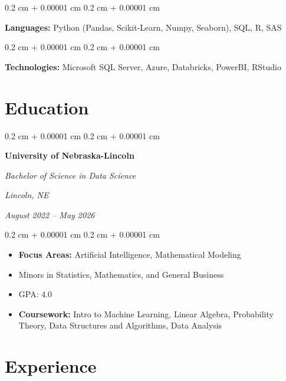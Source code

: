 \documentclass[11pt, letterpaper]{article}
\newenvironment{highlights}{
    \begin{itemize}[
        topsep=0.10 cm,
        parsep=0.10 cm,
        partopsep=0pt,
        itemsep=0pt,
        leftmargin=0.4 cm + 10pt
    ]
}{
    \end{itemize}
} %
\newenvironment{onecolentry}{
    \begin{adjustwidth}{
        0.2 cm + 0.00001 cm
    }{
        0.2 cm + 0.00001 cm
    }
}{
    \end{adjustwidth}
} %
\newenvironment{twocolentry}[2][]{
    \onecolentry
    \def\secondColumn{#2}
    \setcolumnwidth{\fill, 5.0 cm}
    \begin{paracol}{2}
}{
    \switchcolumn \raggedleft \secondColumn
    \end{paracol}
    \endonecolentry
} %
\begin{document}
        
        \begin{onecolentry}
            \textbf{Languages:} Python (Pandas, Scikit-Learn, Numpy, Seaborn), SQL, R, SAS 
        \end{onecolentry}

        \vspace{0.2 cm}

        \begin{onecolentry}
            \textbf{Technologies:} Microsoft SQL Server, Azure, Databricks, PowerBI, RStudio
        \end{onecolentry}



    \section{Education}



        
        \begin{twocolentry}{
        \textit{Lincoln, NE}    
            
        \textit{August 2022 – May 2026}}
            \textbf{University of Nebraska-Lincoln}
            
            \textit{Bachelor of Science in Data Science}
        \end{twocolentry}

        \vspace{0.10 cm}
        \begin{onecolentry}
            \begin{highlights}
                \item \textbf{Focus Areas:} Artificial Intelligence, Mathematical Modeling
                \item Minors in Statistics, Mathematics, and General Business
                \item GPA: 4.0
                \item \textbf{Coursework:} Intro to Machine Learning, Linear Algebra, Probability Theory, Data Structures and Algorithms, Data Analysis
            \end{highlights}
        \end{onecolentry}



    
    \section{Experience}
\end{document}
